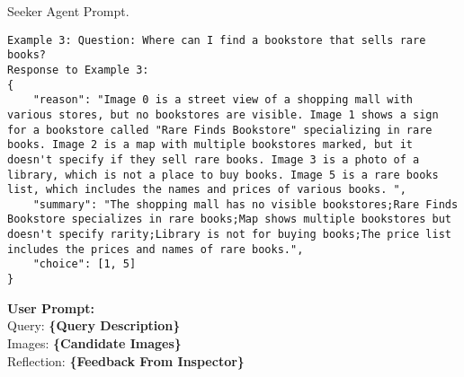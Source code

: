 \begin{figure*}[!ht]
\begin{AIbox}{Seeker Agent Prompt.}
\begin{lstlisting}[style=prompt]
Example 3: Question: Where can I find a bookstore that sells rare books? 
Response to Example 3: 
{
    "reason": "Image 0 is a street view of a shopping mall with various stores, but no bookstores are visible. Image 1 shows a sign for a bookstore called "Rare Finds Bookstore" specializing in rare books. Image 2 is a map with multiple bookstores marked, but it doesn't specify if they sell rare books. Image 3 is a photo of a library, which is not a place to buy books. Image 5 is a rare books list, which includes the names and prices of various books. ",
    "summary": "The shopping mall has no visible bookstores;Rare Finds Bookstore specializes in rare books;Map shows multiple bookstores but doesn't specify rarity;Library is not for buying books;The price list includes the prices and names of rare books.",
    "choice": [1, 5]
}
\end{lstlisting}


\tcblower
{\color{black}\bf \large User Prompt:}\\
Query: {\color{deepblue}\bf \{Query Description\}} \\
Images: {\color{deepblue}\bf \{Candidate Images\}} \\
Reflection:  {\color{deepblue}\bf \{Feedback From Inspector\}} 

\end{AIbox}
\vspace{-1em}
\caption{Prompt of Seeker Agent.}
\label{fig: seeker}
\end{figure*}
